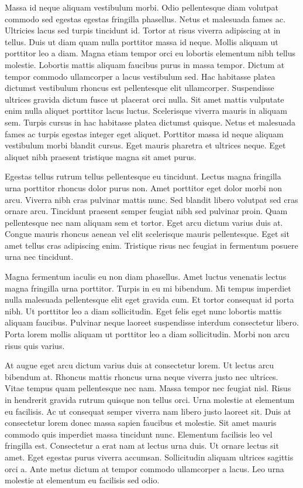 \documentclass[11pt,a4paper]{article}
\begin{document}
Massa id neque aliquam vestibulum morbi. Odio pellentesque diam volutpat commodo sed egestas egestas fringilla phasellus. Netus et malesuada fames ac. Ultricies lacus sed turpis tincidunt id. Tortor at risus viverra adipiscing at in tellus. Duis ut diam quam nulla porttitor massa id neque. Mollis aliquam ut porttitor leo a diam. Magna etiam tempor orci eu lobortis elementum nibh tellus molestie. Lobortis mattis aliquam faucibus purus in massa tempor. Dictum at tempor commodo ullamcorper a lacus vestibulum sed. Hac habitasse platea dictumst vestibulum rhoncus est pellentesque elit ullamcorper. Suspendisse ultrices gravida dictum fusce ut placerat orci nulla. Sit amet mattis vulputate enim nulla aliquet porttitor lacus luctus. Scelerisque viverra mauris in aliquam sem. Turpis cursus in hac habitasse platea dictumst quisque. Netus et malesuada fames ac turpis egestas integer eget aliquet. Porttitor massa id neque aliquam vestibulum morbi blandit cursus. Eget mauris pharetra et ultrices neque. Eget aliquet nibh praesent tristique magna sit amet purus.

Egestas tellus rutrum tellus pellentesque eu tincidunt. Lectus magna fringilla urna porttitor rhoncus dolor purus non. Amet porttitor eget dolor morbi non arcu. Viverra nibh cras pulvinar mattis nunc. Sed blandit libero volutpat sed cras ornare arcu. Tincidunt praesent semper feugiat nibh sed pulvinar proin. Quam pellentesque nec nam aliquam sem et tortor. Eget arcu dictum varius duis at. Congue mauris rhoncus aenean vel elit scelerisque mauris pellentesque. Eget sit amet tellus cras adipiscing enim. Tristique risus nec feugiat in fermentum posuere urna nec tincidunt.

Magna fermentum iaculis eu non diam phasellus. Amet luctus venenatis lectus magna fringilla urna porttitor. Turpis in eu mi bibendum. Mi tempus imperdiet nulla malesuada pellentesque elit eget gravida cum. Et tortor consequat id porta nibh. Ut porttitor leo a diam sollicitudin. Eget felis eget nunc lobortis mattis aliquam faucibus. Pulvinar neque laoreet suspendisse interdum consectetur libero. Porta lorem mollis aliquam ut porttitor leo a diam sollicitudin. Morbi non arcu risus quis varius.

At augue eget arcu dictum varius duis at consectetur lorem. Ut lectus arcu bibendum at. Rhoncus mattis rhoncus urna neque viverra justo nec ultrices. Vitae tempus quam pellentesque nec nam. Massa tempor nec feugiat nisl. Risus in hendrerit gravida rutrum quisque non tellus orci. Urna molestie at elementum eu facilisis. Ac ut consequat semper viverra nam libero justo laoreet sit. Duis at consectetur lorem donec massa sapien faucibus et molestie. Sit amet mauris commodo quis imperdiet massa tincidunt nunc. Elementum facilisis leo vel fringilla est. Consectetur a erat nam at lectus urna duis. Ut ornare lectus sit amet. Eget egestas purus viverra accumsan. Sollicitudin aliquam ultrices sagittis orci a. Ante metus dictum at tempor commodo ullamcorper a lacus. Leo urna molestie at elementum eu facilisis sed odio.
\end{document}
